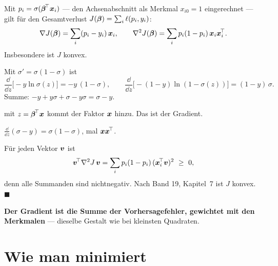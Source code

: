 \begin{merksatz}
Mit $p_i = \sigma(\boldsymbol{\beta}^{\!\top}\boldsymbol{x}_i)$ --- den Achsenabschnitt als Merkmal $x_{i0} = 1$ eingerechnet --- gilt für den Gesamtverlust $J(\boldsymbol{\beta}) = \sum_i \ell(p_i,y_i)$:
\[ \nabla J(\boldsymbol{\beta}) = \sum_i (p_i - y_i)\,\boldsymbol{x}_i , \qquad \nabla^{2}J(\boldsymbol{\beta}) = \sum_i p_i(1-p_i)\,\boldsymbol{x}_i\boldsymbol{x}_i^{\!\top} . \]
Insbesondere ist $J$ konvex.

 Mit $\sigma' = \sigma(1-\sigma)$ ist
\[ \frac{\dd}{\dd z}\bigl[-y\ln\sigma(z)\bigr] = -y\,(1-\sigma), \qquad \frac{\dd}{\dd z}\bigl[-(1-y)\ln(1-\sigma(z))\bigr] = (1-y)\,\sigma . \]
Summe: $-y + y\sigma + \sigma - y\sigma = \sigma - y$.

 mit $z = \boldsymbol{\beta}^{\!\top}\boldsymbol{x}$ kommt der Faktor $\boldsymbol{x}$ hinzu. Das ist der Gradient.

 $\frac{\dd}{\dd z}(\sigma - y) = \sigma(1-\sigma)$, mal $\boldsymbol{x}\boldsymbol{x}^{\!\top}$.

 Für jeden Vektor $\boldsymbol{v}$ ist
\[ \boldsymbol{v}^{\!\top}\nabla^{2}J\,\boldsymbol{v} = \sum_i p_i(1-p_i)\,(\boldsymbol{x}_i^{\!\top}\boldsymbol{v})^{2} \ \ge\ 0 , \]
denn alle Summanden sind nichtnegativ. Nach Band 19, Kapitel~7 ist $J$ konvex. $\blacksquare$

\begin{center}
\begin{minipage}{0.9\textwidth}
\textbf{Der Gradient ist die Summe der Vorhersagefehler, gewichtet mit den Merkmalen} --- dieselbe Gestalt wie bei kleinsten Quadraten.
\end{minipage}
\end{center}

\begin{center}
\begin{minipage}{0.88\textwidth}
\end{minipage}
\end{center}
\end{merksatz}

\section{Wie man minimiert}

